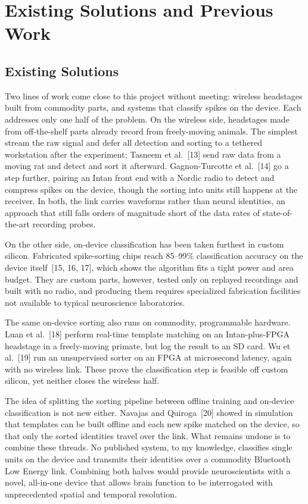 \documentclass[11pt]{article}
\begin{document}
\section{Existing Solutions and Previous Work}

\subsection{Existing Solutions}
Two lines of work come close to this project without meeting: wireless headstages built
from commodity parts, and systems that classify spikes on the device. Each addresses only
one half of the problem. On the wireless side, headstages made from off-the-shelf parts
already record from freely-moving animals. The simplest stream the raw signal and defer
all detection and sorting to a tethered workstation after the experiment; Tasneem et
al.~[13] send raw data from a moving rat and detect and sort it afterward.
Gagnon-Turcotte et al.~[14] go a step further, pairing an Intan front end with a
Nordic radio to detect and compress spikes on the device, though the sorting into units
still happens at the receiver. In both, the link carries waveforms rather than neural
identities, an approach that still falls orders of magnitude short of the data rates of
state-of-the-art recording probes.

On the other side, on-device classification has been taken furthest in custom silicon.
Fabricated spike-sorting chips reach 85--99\% classification accuracy on the device
itself~[15, 16, 17], which shows the algorithm fits a tight power and area budget. They
are custom parts, however, tested only on replayed recordings and built with no radio,
and producing them requires specialized fabrication facilities not available to typical
neuroscience laboratories.

The same on-device sorting also runs on commodity, programmable hardware. Luan et al.~[18]
perform real-time template matching on an Intan-plus-FPGA headstage in a freely-moving
primate, but log the result to an SD card. Wu et al.~[19] run an unsupervised sorter on an
FPGA at microsecond latency, again with no wireless link. These prove the classification
step is feasible off custom silicon, yet neither closes the wireless half.

The idea of splitting the sorting pipeline between offline training and on-device
classification is not new either. Navajas and Quiroga~[20] showed in simulation that
templates can be built offline and each new spike matched on the device, so that only the
sorted identities travel over the link. What remains undone is to combine these threads.
No published system, to my knowledge, classifies single units on the device and transmits
their identities over a commodity Bluetooth Low Energy link. Combining both halves would
provide neuroscientists with a novel, all-in-one device that allows brain function to be
interrogated with unprecedented spatial and temporal resolution.
\end{document}
